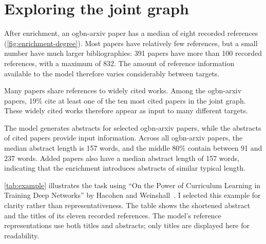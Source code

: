\section{Exploring the joint graph}
\label{sec:exploration}

After enrichment, an ogbn-arxiv paper has a median of eight recorded references (\autoref{fig:enrichment-degree}). Most papers have relatively few references, but a small number have much larger bibliographies: 391 papers have more than 100 recorded references, with a maximum of 832. The amount of reference information available to the model therefore varies considerably between targets.

Many papers share references to widely cited works. Among the ogbn-arxiv papers, 19\% cite at least one of the ten most cited papers in the joint graph. These widely cited works therefore appear as input to many different targets.

The model generates abstracts for selected ogbn-arxiv papers, while the abstracts of cited papers provide input information. Across all ogbn-arxiv papers, the median abstract length is 157 words, and the middle 80\% contain between 91 and 237 words. Added papers also have a median abstract length of 157 words, indicating that the enrichment introduces abstracts of similar typical length.

\autoref{tab:example} illustrates the task using ``On the Power of Curriculum Learning in Training Deep Networks'' by Hacohen and Weinshall~\cite{hacohen2019power}. I selected this example for clarity rather than representativeness. The table shows the shortened abstract and the titles of its eleven recorded references. The model's reference representations use both titles and abstracts; only titles are displayed here for readability.

